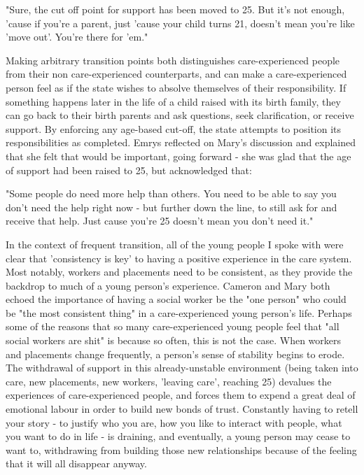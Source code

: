 "Sure, the cut off point for support has been moved to 25. But it's not enough, 'cause if you're a parent, just 'cause your child turns 21, doesn't mean you're like 'move out'. You're there for 'em."

Making arbitrary transition points both distinguishes care-experienced people from their non care-experienced counterparts, and can make a care-experienced person feel as if the state wishes to absolve themselves of their responsibility. If something happens later in the life of a child raised with its birth family, they can go back to their birth parents and ask questions, seek clarification, or receive support. By enforcing any age-based cut-off, the state attempts to position its responsibilities as completed. Emrys reflected on Mary's discussion and explained that she felt that would be important, going forward - she was glad that the age of support had been raised to 25, but acknowledged that:

"Some people do need more help than others. You need to be able to say you don't need the help right now - but further down the line, to still ask for and receive that help. Just cause you're 25 doesn't mean you don't need it."

In the context of frequent transition, all of the young people I spoke with were clear that 'consistency is key' to having a positive experience in the care system. Most notably, workers and placements need to be consistent, as they provide the backdrop to much of a young person’s experience. Cameron and Mary both echoed the importance of having a social worker be the "one person" who could be "the most consistent thing" in a care-experienced young person's life. Perhaps some of the reasons that so many care-experienced young people feel that "all social workers are shit" is because so often, this is not the case. When workers and placements change frequently, a person’s sense of stability begins to erode. The withdrawal of support in this already-unstable environment (being taken into care, new placements, new workers, 'leaving care', reaching 25) devalues the experiences of care-experienced people, and forces them to expend a great deal of emotional labour in order to build new bonds of trust. Constantly having to retell your story - to justify who you are, how you like to interact with people, what you want to do in life - is draining, and eventually, a young person may cease to want to, withdrawing from building those new relationships because of the feeling that it will all disappear anyway.

